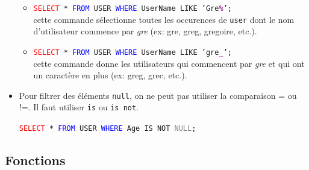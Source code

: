 \documentclass[a4paper]{article}
\begin{document}
\begin{itemize}
\begin{example}
\begin{itemize}
        \item \texttt{\textcolor{red}{SELECT} * \textcolor{blue}{FROM} USER \textcolor{blue}{WHERE} UserName LIKE 'Gre\textcolor{purple}{\%}';}\\
        cette commande sélectionne toutes les occurences de \texttt{user} dont le nom d'utilisateur commence par \textit{gre} (ex: gre, greg, gregoire, etc.).

        \item \texttt{\textcolor{red}{SELECT} * \textcolor{blue}{FROM} USER \textcolor{blue}{WHERE} UserName LIKE 'gre\textcolor{purple}{\_}';}\\
        cette commande donne les utilisateurs qui commencent par \textit{gre} et qui ont un caractère en plus (ex: greg, grec, etc.).

    \end{itemize}
\end{example}



\item Pour filtrer des éléments \texttt{null}, on ne peut pas utiliser la comparaison = ou !=. Il faut utiliser \texttt{is} ou \texttt{is not}.
\begin{example}
    \texttt{\textcolor{red}{SELECT} * \textcolor{blue}{FROM} USER \textcolor{blue}{WHERE} Age IS NOT \textcolor{gray}{NULL};}
\end{example}



\end{itemize}










\subsection{Fonctions}
\end{document}
